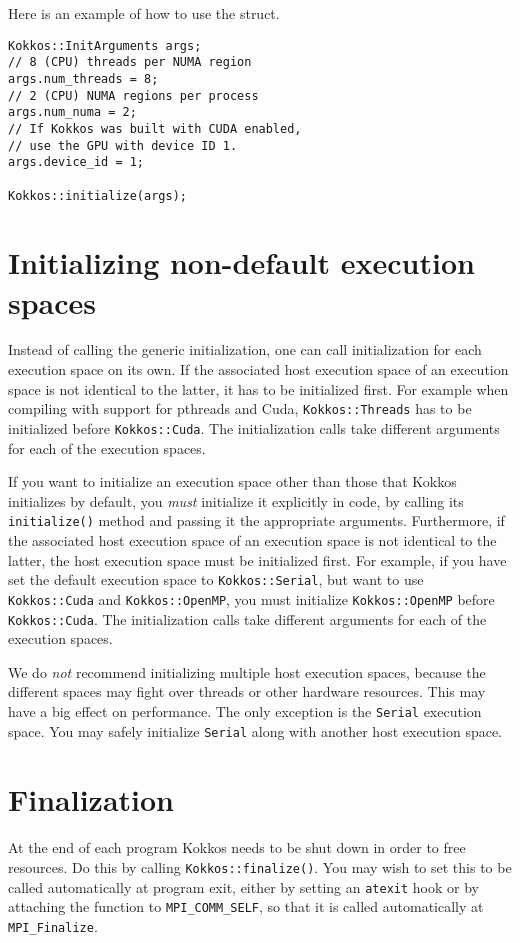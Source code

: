 Here is an example of how to use the struct.
\begin{lstlisting}
Kokkos::InitArguments args;
// 8 (CPU) threads per NUMA region
args.num_threads = 8;
// 2 (CPU) NUMA regions per process
args.num_numa = 2;
// If Kokkos was built with CUDA enabled,
// use the GPU with device ID 1.
args.device_id = 1;

Kokkos::initialize(args);
\end{lstlisting}

\section{Initializing non-default execution spaces}\label{S:init:specific}

Instead of calling the generic initialization, one can call initialization for each execution space on its own. 
If the associated host execution space of an execution space is not identical to the latter, it has to be initialized first.
For example when compiling with support for pthreads and Cuda, \lstinline|Kokkos::Threads| has to be initialized before \lstinline|Kokkos::Cuda|.
The initialization calls take different arguments for each of the execution spaces.

If you want to initialize an execution space other than those that Kokkos initializes by default,
you \emph{must} initialize it explicitly in code, by calling its \lstinline!initialize()! method and passing it the appropriate arguments.
Furthermore, if the associated host execution space of an execution space is not identical to the latter, the host execution space must be initialized first.
For example, if you have set the default execution space to \lstinline!Kokkos::Serial!, 
but want to use \lstinline!Kokkos::Cuda! and \lstinline!Kokkos::OpenMP!, 
you must initialize \lstinline!Kokkos::OpenMP! before \lstinline!Kokkos::Cuda!.
The initialization calls take different arguments for each of the execution spaces.

We do \emph{not} recommend initializing multiple host execution spaces,
because the different spaces may fight over threads or other hardware resources.
This may have a big effect on performance.
The only exception is the \lstinline!Serial! execution space.
You may safely initialize \lstinline!Serial! along with another host execution space.

\section{Finalization}\label{S:init:finalize}

At the end of each program Kokkos needs to be shut down in order to free resources. 
Do this by calling \lstinline!Kokkos::finalize()!.
You may wish to set this to be called automatically at program exit,
either by setting an \lstinline!atexit! hook
or by attaching the function to \lstinline!MPI_COMM_SELF!,
so that it is called automatically at \lstinline!MPI_Finalize!.

